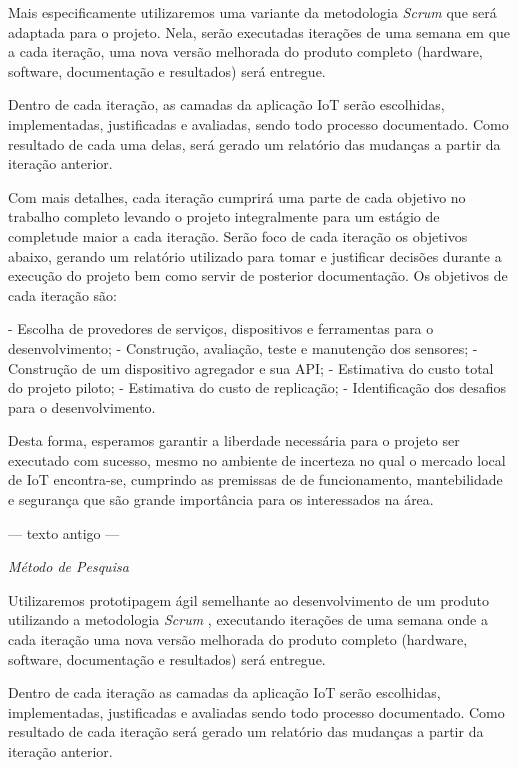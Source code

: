 \documentclass[
	12pt,				%
	openright,			%
	oneside,			%
	a4paper,			%
	chapter=TITLE,		%
	english,			%
	french,				%
	spanish,			%
	brazil				%
	]{abntex2}
\begin{document}
{Mais especificamente utilizaremos uma variante da metodologia \textit{Scrum}
\cite{James2016} que será adaptada para o projeto. Nela, serão executadas iterações
de uma semana em que a cada iteração, uma nova versão melhorada do produto
completo (hardware, software, documentação e resultados) será entregue.

Dentro de cada iteração, as camadas da aplicação IoT serão escolhidas,
implementadas, justificadas e avaliadas, sendo todo processo documentado. Como
resultado de cada uma delas, será gerado um relatório das mudanças a partir da
iteração anterior.

Com mais detalhes, cada iteração cumprirá uma parte de cada objetivo no trabalho
completo levando o projeto integralmente para um estágio de completude maior a
cada iteração. Serão foco de cada iteração os objetivos abaixo, gerando um
relatório utilizado para tomar e justificar decisões durante a execução do
projeto bem como servir de posterior documentação. Os objetivos de cada iteração
são:

- Escolha de provedores de serviços, dispositivos e ferramentas para o
desenvolvimento;
- Construção, avaliação, teste e manutenção dos sensores;
- Construção de um dispositivo agregador e sua API;
- Estimativa do custo total do projeto piloto;
- Estimativa do custo de replicação;
- Identificação dos desafios para o desenvolvimento.

Desta forma, esperamos garantir a liberdade necessária para o projeto ser
executado com sucesso, mesmo no ambiente de incerteza no qual o mercado local de
IoT encontra-se, cumprindo as premissas de de funcionamento, mantebilidade e
segurança que são grande importância para os interessados na área.


--- texto antigo ---

\textit{Método de Pesquisa}

Utilizaremos prototipagem ágil semelhante ao desenvolvimento de um produto
utilizando a metodologia \textit{Scrum} \cite{James2016}, executando iterações
de uma semana onde a cada iteração uma nova versão melhorada do produto completo
(hardware, software, documentação e resultados) será entregue.

Dentro de cada iteração as camadas da aplicação IoT serão escolhidas,
implementadas, justificadas e avaliadas sendo todo processo documentado. Como
resultado de cada iteração será gerado um relatório das mudanças a partir da
iteração anterior.

}
\end{document}
